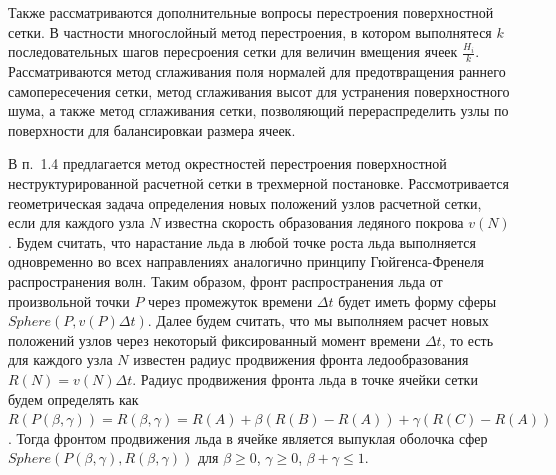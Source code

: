 \documentclass[a4paper,14pt]{extarticle}                     %
\theoremstyle{plain}                                         %
\begin{document}
Также рассматриваются дополнительные вопросы перестроения поверхностной сетки.
В частности многослойный метод перестроения, в котором выполнятеся $k$ последовательных шагов пересроения сетки для величин вмещения ячеек $\frac{H_i}{k}$.
Рассматриваются метод сглаживания поля нормалей для предотвращения раннего самопересечения сетки, метод сглаживания высот для устранения поверхностного шума, а также метод сглаживания сетки, позволяющий перераспределить узлы по поверхности для балансировкаи размера ячеек. 


В п.~1.4 предлагается метод окрестностей перестроения поверхностной неструктурированной расчетной сетки в трехмерной постановке.
Рассмотривается геометрическая задача определения новых положений узлов расчетной сетки, если для каждого узла $N$ известна скорость образования ледяного покрова $v(N)$.
Будем считать, что нарастание льда в любой точке роста льда выполняется одновременно во всех направлениях аналогично принципу Гюйгенса-Френеля распространения волн.
Таким образом, фронт распространения льда от произвольной точки $P$ через промежуток времени $\Delta t$ будет иметь форму сферы $Sphere(P, v(P)\Delta t)$.
Далее будем считать, что мы выполняем расчет новых положений узлов через некоторый фиксированный момент времени $\Delta t$, то есть для каждого узла $N$ известен радиус продвижения фронта ледообразования $R(N) = v(N) \Delta t$.
Радиус продвижения фронта льда в точке ячейки сетки будем определять как $R(P(\beta,\gamma)) = R(\beta,\gamma) = R(A) + \beta(R(B) - R(A)) + \gamma(R(C) - R(A))$.
Тогда фронтом продвижения льда в ячейке является выпуклая оболочка сфер $Sphere(P(\beta, \gamma), R(\beta, \gamma))$ для $\beta \ge 0$, $\gamma \ge 0$, $\beta + \gamma \le 1$.
\end{document}
